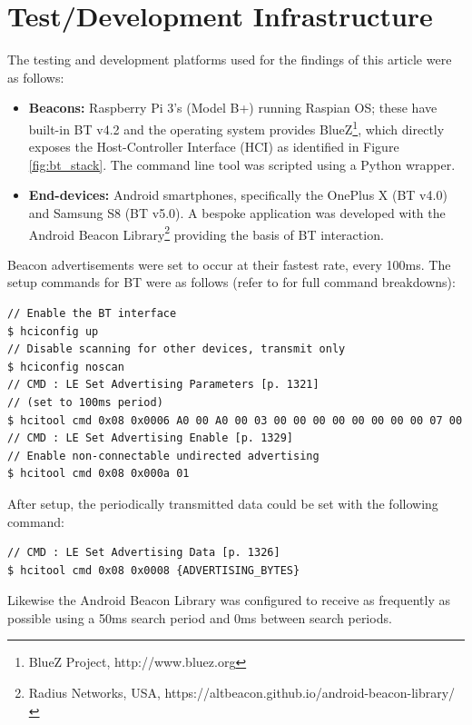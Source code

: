 \documentclass[conference]{IEEEtran} %
\begin{document}
\section{Test/Development Infrastructure}
The testing and development platforms used for the findings of this article were as follows:
\begin{itemize}
	\item \textbf{Beacons:} Raspberry Pi 3's (Model B+) running Raspian OS; these have built-in BT v4.2 and the operating system provides BlueZ\footnote{BlueZ Project, http://www.bluez.org}, which directly exposes the Host-Controller Interface (HCI) as identified in Figure \ref{fig:bt_stack}. The command line tool was scripted using a Python wrapper.
	\item \textbf{End-devices:} Android smartphones, specifically the OnePlus X (BT v4.0) and Samsung S8 (BT v5.0). A bespoke application was developed with the Android Beacon Library\footnote{Radius Networks, USA, https://altbeacon.github.io/android-beacon-library/} providing the basis of BT interaction.
\end{itemize}

Beacon advertisements were set to occur at their fastest rate, every 100ms. The setup commands for BT were as follows (refer to \cite{BT:CORE_SPEC} for full command breakdowns):
\begin{lstlisting}[style=standard]
// Enable the BT interface
$ hciconfig up
// Disable scanning for other devices, transmit only
$ hciconfig noscan
// CMD : LE Set Advertising Parameters [p. 1321]
// (set to 100ms period) 
$ hcitool cmd 0x08 0x0006 A0 00 A0 00 03 00 00 00 00 00 00 00 00 07 00
// CMD : LE Set Advertising Enable [p. 1329]
// Enable non-connectable undirected advertising
$ hcitool cmd 0x08 0x000a 01
\end{lstlisting}
After setup, the periodically transmitted data could be set with the following command:
\begin{lstlisting}[style=standard]
// CMD : LE Set Advertising Data [p. 1326]
$ hcitool cmd 0x08 0x0008 {ADVERTISING_BYTES}
\end{lstlisting}

Likewise the Android Beacon Library was configured to receive as frequently as possible using a 50ms search period and 0ms between search periods.
\end{document}
